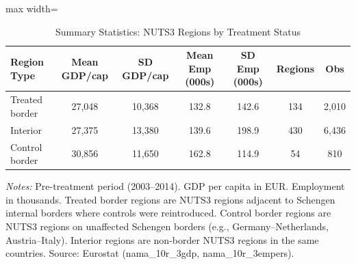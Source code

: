 \begin{table}[htbp]
\centering
\caption{Summary Statistics: NUTS3 Regions by Treatment Status}
\label{tab:summary}
\begin{adjustbox}{max width=\textwidth}
\begin{tabular}{lcccccc}
\toprule
Region Type & Mean GDP/cap & SD GDP/cap & Mean Emp (000s) & SD Emp (000s) & Regions & Obs \\
\midrule
Treated border & 27,048 & 10,368 & 132.8 & 142.6 & 134 & 2,010 \\
Interior & 27,375 & 13,380 & 139.6 & 198.9 & 430 & 6,436 \\
Control border & 30,856 & 11,650 & 162.8 & 114.9 & 54 & 810 \\
\bottomrule
\end{tabular}
\end{adjustbox}
\begin{tablenotes}[flushleft]
\small
\item \textit{Notes:} Pre-treatment period (2003--2014). GDP per capita in EUR. Employment in thousands.
Treated border regions are NUTS3 regions adjacent to Schengen internal borders where controls were reintroduced.
Control border regions are NUTS3 regions on unaffected Schengen borders (e.g., Germany--Netherlands, Austria--Italy).
Interior regions are non-border NUTS3 regions in the same countries.
Source: Eurostat (nama\_10r\_3gdp, nama\_10r\_3empers).
\end{tablenotes}
\end{table}

